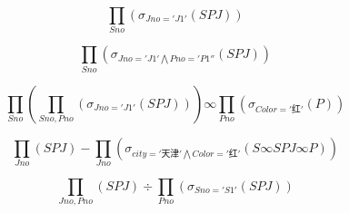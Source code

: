 \documentclass{article}
\begin{document}
    $$\prod_{Sno}(\sigma_{Jno = 'J1'}(SPJ))$$

	$$\prod_{Sno}(\sigma_{Jno = 'J1'\bigwedge Pno = 'P1''}(SPJ))$$

    $$\prod_{Sno}(\prod_{Sno, Pno}(\sigma_{Jno = 'J1'}(SPJ))) \infty \prod_{Pno}(\sigma_{Color = '红'}(P))$$

    $$\prod_{Jno}(SPJ) - \prod_{Jno}(\sigma_{city = '天津' \bigwedge Color = '红'}(S\infty SPJ \infty P))$$

    $$\prod_{Jno, Pno}(SPJ) \div \prod_{Pno}(\sigma_{Sno = 'S1'}(SPJ))$$
\end{document}
